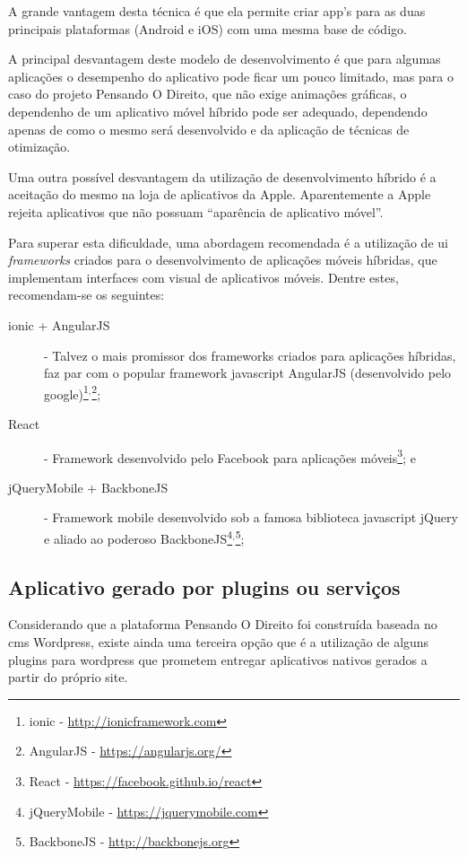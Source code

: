 A grande vantagem desta técnica é que ela permite criar app's para as duas principais plataformas (Android e iOS) com uma mesma base de código.

A principal desvantagem deste modelo de desenvolvimento é que para algumas aplicações o desempenho do aplicativo pode ficar um pouco limitado, mas para o caso do projeto Pensando O Direito, que não exige animações gráficas, o dependenho de um aplicativo móvel híbrido pode ser adequado, dependendo apenas de como o mesmo será desenvolvido e da aplicação de técnicas de otimização.

Uma outra possível desvantagem da utilização de desenvolvimento híbrido é a aceitação do mesmo na loja de aplicativos da Apple. Aparentemente a Apple rejeita aplicativos que não possuam ``aparência de aplicativo móvel''.

Para superar esta dificuldade, uma abordagem recomendada é a utilização de \gls{ui} \textit{frameworks} criados para o desenvolvimento de aplicações móveis híbridas, que implementam interfaces com visual de aplicativos móveis. Dentre estes, recomendam-se os seguintes:
\begin{description}
\item[ionic + AngularJS] - Talvez o mais promissor dos frameworks criados para aplicações híbridas, faz par com o popular framework javascript AngularJS (desenvolvido pelo google)\footnote{ionic - \url{http://ionicframework.com}}$^,$\footnote{AngularJS - \url{https://angularjs.org/}};
\item[React] - Framework desenvolvido pelo Facebook para aplicações móveis\footnote{React - \url{https://facebook.github.io/react}}; e
\item[jQueryMobile + BackboneJS] - Framework mobile desenvolvido sob a famosa biblioteca javascript jQuery e aliado ao poderoso BackboneJS\footnote{jQueryMobile - \url{https://jquerymobile.com}}$^,$\footnote{BackboneJS - \url{http://backbonejs.org}};
\end{description}

\subsection{Aplicativo gerado por plugins ou serviços}
Considerando que a plataforma Pensando O Direito foi construída baseada no \gls{cms} Wordpress, existe ainda uma terceira opção que é a utilização de alguns plugins para wordpress que prometem entregar aplicativos nativos gerados a partir do próprio site.

